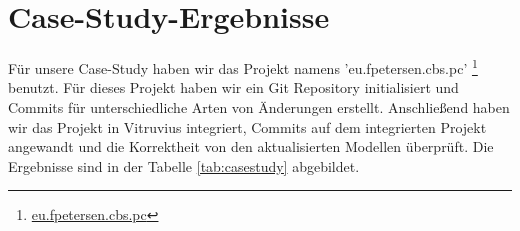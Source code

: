 \chapter{Case-Study-Ergebnisse}
\label{ch:Case-Study-Ergebnisse}
Für unsere Case-Study haben wir das Projekt namens 'eu.fpetersen.cbs.pc' \footnote{\href{https://github.com/vitruv-tools/Vitruv-Applications-PCMJavaAdditionals/tree/master/tests/tools.vitruv.applications.pcmjava.linkingintegration.tests/example_code/eu.fpetersen.cbs.pc}{eu.fpetersen.cbs.pc}} benutzt. Für dieses Projekt haben wir ein Git Repository initialisiert und Commits für unterschiedliche Arten von Änderungen erstellt. Anschließend haben wir das Projekt in Vitruvius integriert, Commits auf dem integrierten Projekt angewandt und die Korrektheit von den aktualisierten Modellen überprüft. Die Ergebnisse sind in der Tabelle \ref{tab:casestudy} abgebildet.


